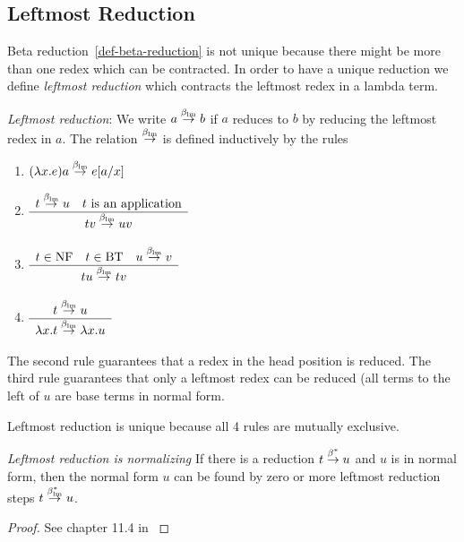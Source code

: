 \documentclass[12pt]{article}
\begin{document}
\subsection{Leftmost Reduction}

Beta reduction~\ref{def-beta-reduction} is not unique because there might be
more than one redex which can be contracted. In order to have a unique reduction
we define \emph{leftmost reduction} which contracts the leftmost redex in a
lambda term.


\begin{definition}
    \emph{Leftmost reduction}:
    \label{def-leftmost-reduction}
    We write $a \stackrel{\beta_{\text{lm}}}\to b$ if $a$ reduces to $b$ by reducing the leftmost
    redex in $a$. The relation $\stackrel{\beta_{\text{lm}}}\to$ is defined inductively by the rules
    \begin{enumerate}
        \item $(\lambda x. e) a \stackrel{\beta_{\text{lm}}}\to e[a/x]$

        \item $\begin{array}{c} 
                t \stackrel{\beta_{\text{lm}}}\to u
                \quad t \text{ is an application}
             \\ \hline 
                t v \stackrel{\beta_{\text{lm}}}\to u v
             \end{array}$

        \item $
            \begin{array}{c} 
                t \in \text{NF}
                \quad t \in \text{BT}
                \quad u \stackrel{\beta_{\text{lm}}}\to v
             \\ \hline 
                t u \stackrel{\beta_{\text{lm}}}\to t v
             \end{array}
            $

        \item $\begin{array}{c} t \stackrel{\beta_{\text{lm}}}\to u \\ \hline \lambda x. t \stackrel{\beta_{\text{lm}}}\to \lambda x . u \end{array}$
    \end{enumerate}
    The second rule guarantees that a redex in the head position is reduced. The
    third rule guarantees that only a leftmost redex can be reduced (all terms
    to the left of $u$ are base terms in normal form.

    Leftmost reduction is unique because all 4 rules are mutually exclusive.
\end{definition}



\begin{theorem}
    \emph{Leftmost reduction is normalizing}
    \label{thm-leftmost-reduction-normalizing}
    If there is a reduction $t \stackrel{\beta^*}\to u$ and $u$ is in normal form, then
    the normal form $u$ can be found by zero or more leftmost reduction steps $t
    \stackrel{\beta^*_{\text{lm}}}\to u$.
    \begin{proof}
        See chapter 11.4 in \cite{Barendregt84}
    \end{proof}
\end{theorem}
\end{document}
